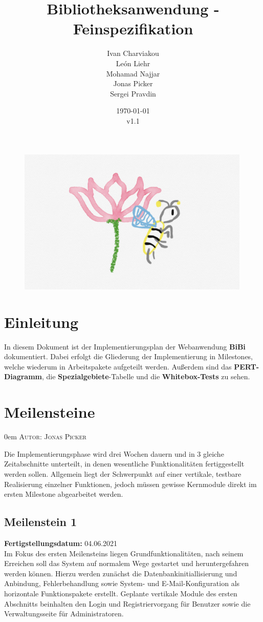 \documentclass{article}
\title{Bibliotheksanwendung - Feinspezifikation}
\date{\today\\v1.1}
\author{
	Ivan Charviakou\\
	León Liehr\\
	Mohamad Najjar\\
	Jonas Picker\\
	Sergei Pravdin
}
\makeatletter
\newcommand{\sectionauthor}[1]{
	{\parindent 0em \large \scshape Autor: #1 \par \nobreak \vspace*{1em}}
	\@afterheading
}
\makeatother
\begin{document}
\maketitle
\begin{figure}[H]
	\centering
	\includegraphics[width = 30em]{Logo}
\end{figure}
\newpage
\tableofcontents
\newpage

\section{Einleitung}
In diesem Dokument ist der Implementierungsplan der Webanwendung \textbf{BiBi} dokumentiert. Dabei  erfolgt die Gliederung der Implementierung in Milestones, welche wiederum in Arbeitspakete aufgeteilt werden. Außerdem sind das \textbf{PERT-Diagramm},   die \textbf{Spezialgebiete}-Tabelle und die \textbf{Whitebox-Tests} zu sehen.

\section{Meilensteine}
\sectionauthor{Jonas Picker}
Die Implementierungsphase wird drei Wochen dauern und in 3 gleiche Zeitabschnitte unterteilt, in denen wesentliche Funktionalitäten fertiggestellt werden sollen. Allgemein liegt der Schwerpunkt auf einer vertikale, testbare Realisierung einzelner Funktionen, jedoch müssen gewisse Kernmodule direkt im ersten Milestone abgearbeitet werden.
\subsection{Meilenstein 1}
\textbf{Fertigstellungsdatum:} 04.06.2021 \\
Im Fokus des ersten Meilensteins liegen Grundfunktionalitäten, nach seinem Erreichen soll das System auf normalem Wege gestartet und heruntergefahren werden können. Hierzu werden zunächst die Datenbankinitiallisierung und Anbindung, Fehlerbehandlung sowie System- und E-Mail-Konfiguration als horizontale Funktionspakete erstellt. Geplante vertikale Module des ersten Abschnitts beinhalten den Login und Registriervorgang für Benutzer sowie die Verwaltungsseite für Administratoren.
\end{document}

